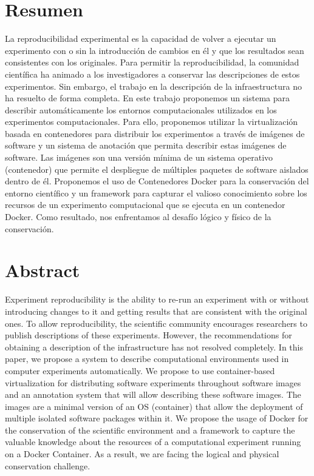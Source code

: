 

\section*{Resumen}

La reproducibilidad experimental es la capacidad de volver a ejecutar un experimento con o sin la introducción de cambios en él y que los resultados sean consistentes con los originales. 
Para permitir la reproducibilidad, la comunidad científica ha animado a los investigadores a conservar las descripciones de estos experimentos. 
Sin embargo, el trabajo en la descripción de la infraestructura no ha resuelto de forma completa.
En este trabajo proponemos un sistema para describir automáticamente los entornos computacionales utilizados en los experimentos computacionales. 
Para ello, proponemos utilizar la virtualización basada en contenedores para distribuir los experimentos a través de imágenes de software y un sistema de anotación que permita describir estas imágenes de software. 
Las imágenes son una versión mínima de un sistema operativo (contenedor) que permite el despliegue de múltiples paquetes de software aislados dentro de él. 
Proponemos el uso de Contenedores Docker para la conservación del entorno científico y un framework para capturar el valioso conocimiento sobre los recursos de un experimento computacional que se ejecuta en un contenedor Docker.
Como resultado, nos enfrentamos al desafío lógico y físico de la conservación. 
 \newpage
\section*{Abstract}
% 
Experiment reproducibility is the ability to re-run an experiment with or without introducing changes to it and getting results that are consistent with the original ones. 
To allow reproducibility, the scientific community encourages researchers to publish descriptions of these experiments. 
However, the recommendations for obtaining a description of the infrastructure has not resolved completely.
In this paper, we propose a system to describe computational environments used in computer experiments automatically. We propose to use container-based virtualization for distributing software experiments throughout software images and an annotation system that will allow describing these software images. The images are a minimal version of an OS (container) that allow the deployment of multiple isolated software packages within it. 
We propose the usage of Docker for the conservation of the scientific environment and a framework to capture the valuable knowledge about the resources of a computational experiment running on a Docker Container. As a result, we are facing the logical and physical conservation challenge. 